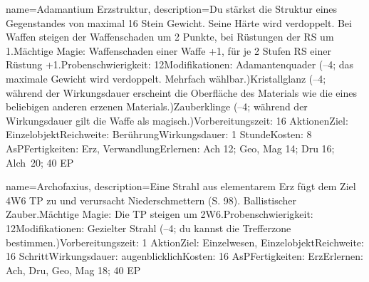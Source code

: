 {
    name={Adamantium Erzstruktur},
    description={Du stärkst die Struktur eines Gegenstandes von maximal 16 Stein Gewicht. Seine Härte wird verdoppelt. Bei Waffen steigen der Waffenschaden um 2 Punkte, bei Rüstungen der RS um 1.\newline Mächtige Magie: Waffenschaden einer Waffe +1, für je 2 Stufen RS einer Rüstung +1.\newline Probenschwierigkeit: 12\newline Modifikationen: Adamantenquader (–4; das maximale Gewicht wird verdoppelt. Mehrfach wählbar.)\newline Kristallglanz (–4; während der Wirkungsdauer erscheint die Oberfläche des Materials wie die eines beliebigen anderen erzenen Materials.)\newline Zauberklinge (–4; während der Wirkungsdauer gilt die Waffe als magisch.)\newline Vorbereitungszeit: 16 Aktionen\newline Ziel: Einzelobjekt\newline Reichweite: Berührung\newline Wirkungsdauer: 1 Stunde\newline Kosten: 8 AsP\newline Fertigkeiten: Erz, Verwandlung\newline Erlernen: Ach 12; Geo, Mag 14; Dru 16; Alch 20; 40 EP}
}


{
    name={Archofaxius},
    description={Eine Strahl aus elementarem Erz fügt dem Ziel 4W6 TP zu und verursacht Niederschmettern (S. 98). Ballistischer Zauber.\newline Mächtige Magie: Die TP steigen um 2W6.\newline Probenschwierigkeit: 12\newline Modifikationen: Gezielter Strahl (–4; du kannst die Trefferzone bestimmen.)\newline Vorbereitungszeit: 1 Aktion\newline Ziel: Einzelwesen, Einzelobjekt\newline Reichweite: 16 Schritt\newline Wirkungsdauer: augenblicklich\newline Kosten: 16 AsP\newline Fertigkeiten: Erz\newline Erlernen: Ach, Dru, Geo, Mag 18; 40 EP}
}


